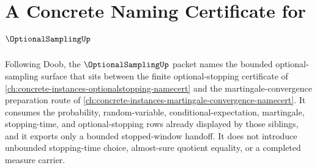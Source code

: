 \chapter{A Concrete Naming Certificate for $\OptionalSamplingUp$}
\label{ch:concrete-instances-optional-sampling-namecert}

Following Doob, the $\OptionalSamplingUp$ packet names the bounded optional-sampling surface that sits between the finite optional-stopping certificate of \autoref{ch:concrete-instances-optionalstopping-namecert} and the martingale-convergence preparation route of \autoref{ch:concrete-instances-martingale-convergence-namecert}. It consumes the probability, random-variable, conditional-expectation, martingale, stopping-time, and optional-stopping rows already displayed by those siblings, and it exports only a bounded stopped-window handoff. It does not introduce unbounded stopping-time choice, almost-sure quotient equality, or a completed measure carrier.

